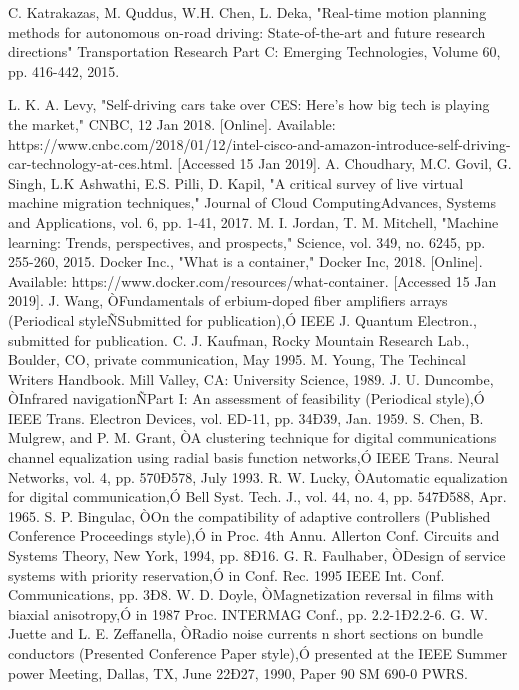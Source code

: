 
 C. Katrakazas, M. Quddus, W.H. Chen, L. Deka, "Real-time motion planning methods for autonomous on-road driving: State-of-the-art and future research directions" Transportation Research Part C: Emerging Technologies, Volume 60, pp. 416-442, 2015. 

 L. K. A. Levy, "Self-driving cars take over CES: Here's how big tech is playing the market," CNBC, 12 Jan 2018. [Online]. Available: https://www.cnbc.com/2018/01/12/intel-cisco-and-amazon-introduce-self-driving-car-technology-at-ces.html. [Accessed 15 Jan 2019].
 A. Choudhary, M.C. Govil, G. Singh, L.K Ashwathi, E.S. Pilli, D. Kapil, "A critical survey of live virtual machine migration techniques," Journal of Cloud ComputingAdvances, Systems and Applications, vol. 6, pp. 1-41, 2017.
 M. I. Jordan, T. M. Mitchell, "Machine learning: Trends, perspectives, and prospects," Science, vol. 349, no. 6245, pp. 255-260, 2015.
 Docker Inc., "What is a container," Docker Inc, 2018. [Online]. Available: https://www.docker.com/resources/what-container. [Accessed 15 Jan 2019].
 J. Wang, ÒFundamentals of erbium-doped fiber amplifiers arrays (Periodical styleÑSubmitted for publication),Ó IEEE J. Quantum Electron., submitted for publication.
 C. J. Kaufman, Rocky Mountain Research Lab., Boulder, CO, private communication, May 1995.
 M. Young, The Techincal Writers Handbook.  Mill Valley, CA: University Science, 1989.
 J. U. Duncombe, ÒInfrared navigationÑPart I: An assessment of feasibility (Periodical style),Ó IEEE Trans. Electron Devices, vol. ED-11, pp. 34Ð39, Jan. 1959.
 S. Chen, B. Mulgrew, and P. M. Grant, ÒA clustering technique for digital communications channel equalization using radial basis function networks,Ó IEEE Trans. Neural Networks, vol. 4, pp. 570Ð578, July 1993.
 R. W. Lucky, ÒAutomatic equalization for digital communication,Ó Bell Syst. Tech. J., vol. 44, no. 4, pp. 547Ð588, Apr. 1965.
 S. P. Bingulac, ÒOn the compatibility of adaptive controllers (Published Conference Proceedings style),Ó in Proc. 4th Annu. Allerton Conf. Circuits and Systems Theory, New York, 1994, pp. 8Ð16.
 G. R. Faulhaber, ÒDesign of service systems with priority reservation,Ó in Conf. Rec. 1995 IEEE Int. Conf. Communications, pp. 3Ð8.
 W. D. Doyle, ÒMagnetization reversal in films with biaxial anisotropy,Ó in 1987 Proc. INTERMAG Conf., pp. 2.2-1Ð2.2-6.
 G. W. Juette and L. E. Zeffanella, ÒRadio noise currents n short sections on bundle conductors (Presented Conference Paper style),Ó presented at the IEEE Summer power Meeting, Dallas, TX, June 22Ð27, 1990, Paper 90 SM 690-0 PWRS.
